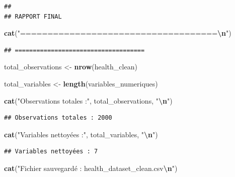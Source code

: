 \documentclass[
]{article}
\newenvironment{Shaded}{\begin{snugshade}}{\end{snugshade}}
\newcommand{\FunctionTok}[1]{\textcolor[rgb]{0.13,0.29,0.53}{\textbf{#1}}}
\newcommand{\NormalTok}[1]{#1}
\newcommand{\OtherTok}[1]{\textcolor[rgb]{0.56,0.35,0.01}{#1}}
\newcommand{\SpecialCharTok}[1]{\textcolor[rgb]{0.81,0.36,0.00}{\textbf{#1}}}
\newcommand{\StringTok}[1]{\textcolor[rgb]{0.31,0.60,0.02}{#1}}
\begin{document}
\begin{verbatim}
## 
## RAPPORT FINAL
\end{verbatim}

\begin{Shaded}
\begin{Highlighting}[]
\FunctionTok{cat}\NormalTok{(}\StringTok{"====================================}\SpecialCharTok{\textbackslash{}n}\StringTok{"}\NormalTok{)}
\end{Highlighting}
\end{Shaded}

\begin{verbatim}
## ====================================
\end{verbatim}

\begin{Shaded}
\begin{Highlighting}[]
\NormalTok{total\_observations }\OtherTok{\textless{}{-}} \FunctionTok{nrow}\NormalTok{(health\_clean)}

\NormalTok{total\_variables }\OtherTok{\textless{}{-}} \FunctionTok{length}\NormalTok{(variables\_numeriques)}

\FunctionTok{cat}\NormalTok{(}\StringTok{"Observations totales :"}\NormalTok{, total\_observations, }\StringTok{"}\SpecialCharTok{\textbackslash{}n}\StringTok{"}\NormalTok{)}
\end{Highlighting}
\end{Shaded}

\begin{verbatim}
## Observations totales : 2000
\end{verbatim}

\begin{Shaded}
\begin{Highlighting}[]
\FunctionTok{cat}\NormalTok{(}\StringTok{"Variables nettoyées :"}\NormalTok{, total\_variables, }\StringTok{"}\SpecialCharTok{\textbackslash{}n}\StringTok{"}\NormalTok{)}
\end{Highlighting}
\end{Shaded}

\begin{verbatim}
## Variables nettoyées : 7
\end{verbatim}

\begin{Shaded}
\begin{Highlighting}[]
\FunctionTok{cat}\NormalTok{(}\StringTok{"Fichier sauvegardé : health\_dataset\_clean.csv}\SpecialCharTok{\textbackslash{}n}\StringTok{"}\NormalTok{)}
\end{Highlighting}
\end{Shaded}
\end{document}
